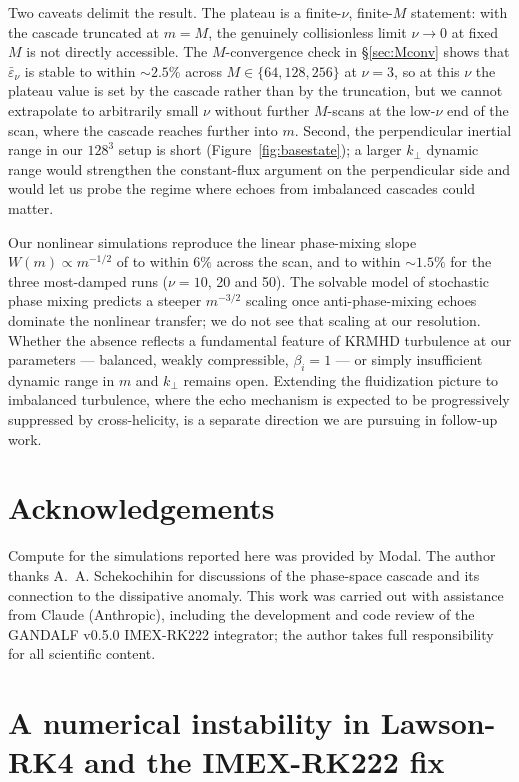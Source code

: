\documentclass[11pt]{article}
\newcommand{\epsnu}{\varepsilon_\nu}
\newcommand{\kperp}{k_\perp}
\begin{document}
Two caveats delimit the result. The plateau is a finite-$\nu$, finite-$M$ statement: with the cascade truncated at $m = M$, the genuinely collisionless limit $\nu \to 0$ at fixed $M$ is not directly accessible. The $M$-convergence check in \S\ref{sec:Mconv} shows that $\bar\epsnu$ is stable to within $\sim 2.5\%$ across $M \in \{64, 128, 256\}$ at $\nu = 3$, so at this $\nu$ the plateau value is set by the cascade rather than by the truncation, but we cannot extrapolate to arbitrarily small $\nu$ without further $M$-scans at the low-$\nu$ end of the scan, where the cascade reaches further into $m$. Second, the perpendicular inertial range in our $128^3$ setup is short (Figure~\ref{fig:basestate}); a larger $k_\perp$ dynamic range would strengthen the constant-flux argument on the perpendicular side and would let us probe the regime where echoes from imbalanced cascades could matter.

Our nonlinear simulations reproduce the linear phase-mixing slope $W(m) \propto m^{-1/2}$ of \citet{zocco2011} to within $6\%$ across the scan, and to within $\sim\!1.5\%$ for the three most-damped runs ($\nu = 10$, 20 and 50). The \citet{adkins2018} solvable model of stochastic phase mixing predicts a steeper $m^{-3/2}$ scaling once anti-phase-mixing echoes dominate the nonlinear transfer; we do not see that scaling at our resolution. Whether the absence reflects a fundamental feature of KRMHD turbulence at our parameters --- balanced, weakly compressible, $\beta_i = 1$ --- or simply insufficient dynamic range in $m$ and $\kperp$ remains open. Extending the \citet{meyrand2019} fluidization picture to imbalanced turbulence, where the echo mechanism is expected to be progressively suppressed by cross-helicity, is a separate direction we are pursuing in follow-up work.

\section*{Acknowledgements}

Compute for the simulations reported here was provided by Modal. The author thanks A.~A. Schekochihin for discussions of the phase-space cascade and its connection to the dissipative anomaly. This work was carried out with assistance from Claude (Anthropic), including the development and code review of the GANDALF v0.5.0 IMEX-RK222 integrator; the author takes full responsibility for all scientific content.

\appendix

\section{A numerical instability in Lawson-RK4 and the IMEX-RK222 fix}
\label{app:imex}
\end{document}

